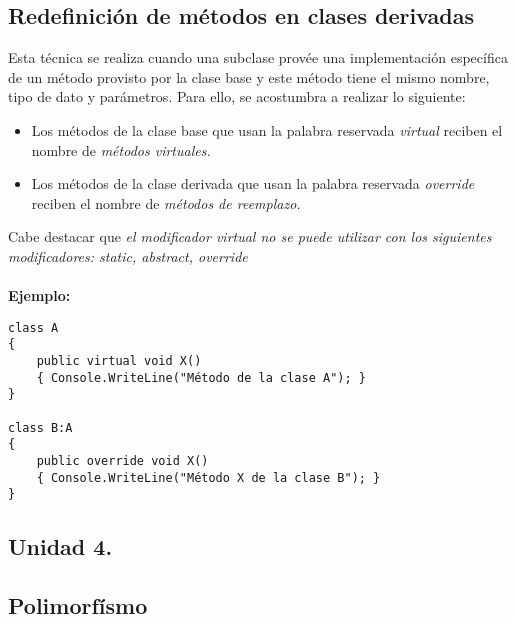 \documentclass[letterpaper, 12pt]{article}
\begin{document}
\begin{justify}
        \subsection{Redefinición de métodos en clases derivadas}
        Esta técnica se realiza cuando una subclase provée una implementación específica de un método provisto por la clase base y este método tiene el mismo nombre,
        tipo de dato y parámetros. Para ello, se acostumbra a realizar lo siguiente:
        \begin{itemize}
            \item Los métodos de la clase base que usan la palabra reservada \emph{virtual} reciben el nombre de \emph{métodos virtuales.}
            \item Los métodos de la clase derivada que usan la palabra reservada \emph{override} reciben el nombre de \emph{métodos de reemplazo.}
        \end{itemize}
        Cabe destacar que \emph{el modificador virtual no se puede utilizar con los siguientes modificadores: static, abstract, override}\\
        \textbf{\\Ejemplo:}
            \begin{verbatim}
class A
{
    public virtual void X()
    { Console.WriteLine("Método de la clase A"); }
}

class B:A
{
    public override void X()
    { Console.WriteLine("Método X de la clase B"); }
}
            \end{verbatim}
    \end{justify}

    \newpage
        \justify
        \begin{huge}
            \bigbreak
            \bigbreak
            \bigbreak
            \section*{\huge{Unidad 4.}}
            \subsection*{\huge{Polimorfísmo}}
        \end{huge}
\end{document}
